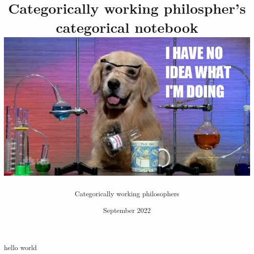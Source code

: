 \documentclass[12pt]{article}
\title{{Categorically working philospher's categorical notebook}\\
{\includegraphics[width=\textwidth]{dog.jpg}}}
\author{Categorically working philosophers}
\date{September 2022}
\begin{document}
\maketitle

hello world

\printbibliography
\end{document}
